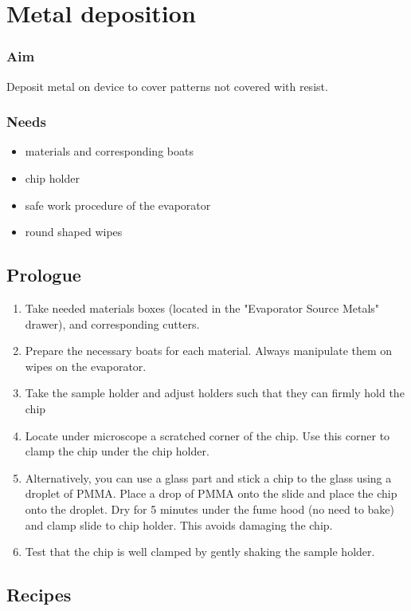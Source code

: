 \documentclass[12pt,a4paper]{report}
\begin{document}
\newpage

\section{Metal deposition}
\subsubsection{Aim}
Deposit metal on device to cover patterns not covered with resist.

\subsubsection{Needs}
\begin{itemize}[noitemsep]
  \item materials and corresponding boats
  \item chip holder
  \item safe work procedure of the evaporator
  \item round shaped wipes
\end{itemize}

\subsection{Prologue}
\begin{enumerate}
\item Take needed materials boxes (located in the "Evaporator Source Metals" drawer), and corresponding cutters.
\item Prepare the necessary boats for each material. Always manipulate them on wipes on the evaporator.
\item Take the sample holder and adjust holders such that they can firmly hold the chip
\item Locate under microscope a scratched corner of the chip. Use this corner to clamp the chip under the chip holder.
\item Alternatively, you can use a glass part and stick a chip to the glass using a droplet of PMMA. Place
a drop of PMMA onto the slide and place the chip onto the droplet. Dry for 5 minutes under the fume hood (no need to bake)
and clamp slide to chip holder. This avoids damaging the chip.
\item Test that the chip is well clamped by gently shaking the sample holder.
\end{enumerate}
\newpage
\subsection{Recipes}
\end{document}
